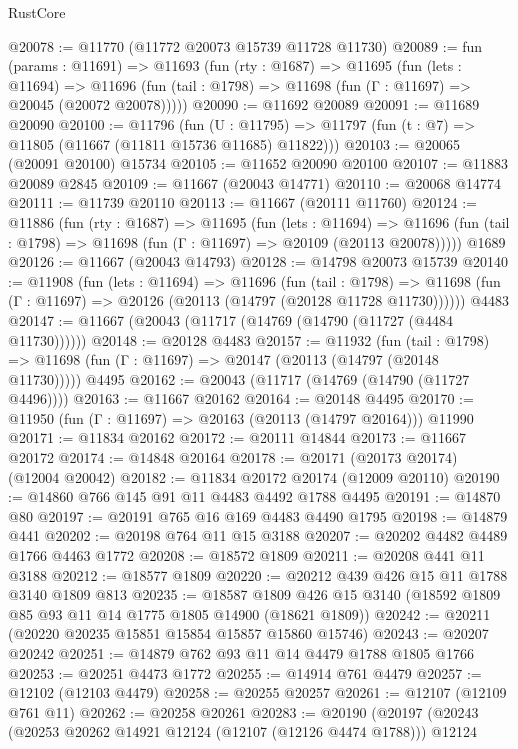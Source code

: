 \begin{lexlean}{RustCore}
\begin{coremodule}
@20078 := @11770 (@11772 @20073 @15739 @11728 @11730)
@20089 := fun (params : @11691) =>
  @11693
    (fun (rty : @1687) =>
    @11695
      (fun (lets : @11694) =>
      @11696 (fun (tail : @1798) => @11698 (fun (Γ : @11697) => @20045 (@20072 @20078)))))
@20090 := @11692 @20089
@20091 := @11689 @20090
@20100 := @11796
    (fun (U : @11795) => @11797 (fun (t : @7) => @11805 (@11667 (@11811 @15736 @11685) @11822)))
@20103 := @20065 (@20091 @20100) @15734
@20105 := @11652 @20090 @20100
@20107 := @11883 @20089 @2845
@20109 := @11667 (@20043 @14771)
@20110 := @20068 @14774
@20111 := @11739 @20110
@20113 := @11667 (@20111 @11760)
@20124 := @11886
    (fun (rty : @1687) =>
    @11695
      (fun (lets : @11694) =>
      @11696 (fun (tail : @1798) => @11698 (fun (Γ : @11697) => @20109 (@20113 @20078)))))
    @1689
@20126 := @11667 (@20043 @14793)
@20128 := @14798 @20073 @15739
@20140 := @11908
    (fun (lets : @11694) =>
    @11696
      (fun (tail : @1798) =>
      @11698 (fun (Γ : @11697) => @20126 (@20113 (@14797 (@20128 @11728 @11730))))))
    @4483
@20147 := @11667 (@20043 (@11717 (@14769 (@14790 (@11727 (@4484 @11730))))))
@20148 := @20128 @4483
@20157 := @11932
    (fun (tail : @1798) => @11698 (fun (Γ : @11697) => @20147 (@20113 (@14797 (@20148 @11730)))))
    @4495
@20162 := @20043 (@11717 (@14769 (@14790 (@11727 @4496))))
@20163 := @11667 @20162
@20164 := @20148 @4495
@20170 := @11950 (fun (Γ : @11697) => @20163 (@20113 (@14797 @20164))) @11990
@20171 := @11834 @20162
@20172 := @20111 @14844
@20173 := @11667 @20172
@20174 := @14848 @20164
@20178 := @20171 (@20173 @20174) (@12004 @20042)
@20182 := @11834 @20172 @20174 (@12009 @20110)
@20190 := @14860 @766 @145 @91 @11 @4483 @4492 @1788 @4495
@20191 := @14870 @80
@20197 := @20191 @765 @16 @169 @4483 @4490 @1795
@20198 := @14879 @441
@20202 := @20198 @764 @11 @15 @3188
@20207 := @20202 @4482 @4489 @1766 @4463 @1772
@20208 := @18572 @1809
@20211 := @20208 @441 @11 @3188
@20212 := @18577 @1809
@20220 := @20212 @439 @426 @15 @11 @1788 @3140 @1809 @813
@20235 := @18587
    @1809
    @426
    @15
    @3140
    (@18592 @1809 @85 @93 @11 @14 @1775 @1805 @14900 (@18621 @1809))
@20242 := @20211 (@20220 @20235 @15851 @15854 @15857 @15860 @15746)
@20243 := @20207 @20242
@20251 := @14879 @762 @93 @11 @14 @4479 @1788 @1805 @1766
@20253 := @20251 @4473 @1772
@20255 := @14914 @761 @4479
@20257 := @12102 (@12103 @4479)
@20258 := @20255 @20257
@20261 := @12107 (@12109 @761 @11)
@20262 := @20258 @20261
@20283 := @20190
    (@20197
      (@20243
        (@20253 @20262 @14921 @12124 (@12107 (@12126 @4474 @1788)))
        @12124

\end{coremodule}
\end{lexlean}

